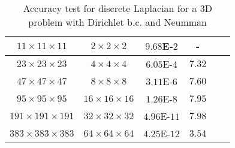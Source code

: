 \begin{table}[!ht]
\begin{tabular}{|c|c|c c|c c|}
    \hline
    $11\times 11\times 11$ & $2\times 2 \times 2$ & $9.68$E-$2$ & - & &\\
    \hline
    $23\times 23\times 23$ & $4\times 4 \times 4$ & $6.05$E-$4$ & $7.32$ & &\\
    \hline
    $47\times 47\times 47$ & $8\times 8 \times 8$ & $3.11$E-$6$ & $7.60$ & &\\
    \hline
    $95\times 95\times 95$ & $16\times 16 \times 16$ & $1.26$E-$8$ & $7.95$ & &\\
    \hline
    $191\times 191\times 191$ & $32\times 32 \times 32$ & $4.96$E-$11$ & $7.98$ & &\\
    \hline
    $383\times 383\times 383$ & $64\times 64 \times 64$ & $4.25$E-$12$ & $3.54$& &\\
    \hline
    \end{tabular}
    \caption{Accuracy test for discrete Laplacian for a 3D problem with Dirichlet b.c. and Neumman}
    \label{tab1:accuracy test}
\end{table}



